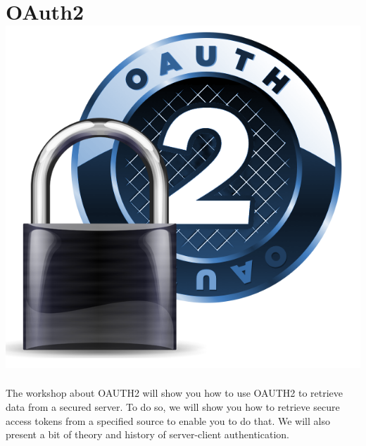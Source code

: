 \section*{OAuth2\hfill\includegraphics[width=.35\linewidth]{images/LogoOAUTH2.png}}
The workshop about OAUTH2 will show you how to use OAUTH2 to retrieve data from a secured server.
To do so, we will show you how to retrieve secure access tokens from a specified source to enable you to do that.
We will also present a bit of theory and history of server-client authentication.

